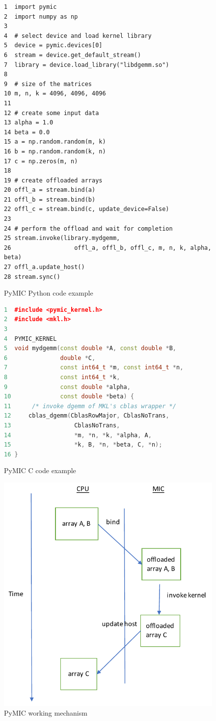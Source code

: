 \begin{figure}
    \centering
    \begin{lstlisting}
1  import pymic
2  import numpy as np
3
4  # select device and load kernel library
5  device = pymic.devices[0]
6  stream = device.get_default_stream()
7  library = device.load_library("libdgemm.so")
8
9  # size of the matrices
10 m, n, k = 4096, 4096, 4096
11
12 # create some input data
13 alpha = 1.0
14 beta = 0.0
15 a = np.random.random(m, k) 
16 b = np.random.random(k, n) 
17 c = np.zeros(m, n)
18
19 # create offloaded arrays
20 offl_a = stream.bind(a)
21 offl_b = stream.bind(b)
22 offl_c = stream.bind(c, update_device=False)
23
24 # perform the offload and wait for completion
25 stream.invoke(library.mydgemm,
26                  offl_a, offl_b, offl_c, m, n, k, alpha, beta)
27 offl_a.update_host()
28 stream.sync()
\end{lstlisting}
    \caption{PyMIC Python code example}  
    \label{fig : Pymic dgemm }
\end{figure}

\begin{figure}
    \centering
    \begin{lstlisting}[language=C++]
1  #include <pymic_kernel.h>
2  #include <mkl.h>
3
4  PYMIC_KERNEL
5  void mydgemm(const double *A, const double *B,
6               double *C,
7               const int64_t *m, const int64_t *n,
8               const int64_t *k,
9               const double *alpha,
10              const double *beta) {
11      /* invoke dgemm of MKL's cblas wrapper */
12     cblas_dgemm(CblasRowMajor, CblasNoTrans,
13                  CblasNoTrans,
14                  *m, *n, *k, *alpha, A,
15                  *k, B, *n, *beta, C, *n);
16 }
\end{lstlisting}
    \caption{PyMIC C code example}
    \label{fig : C dgemm}

\end{figure}

\begin{figure}[h]
\centering
\includegraphics[scale=0.5]{img/working-mechanism.pdf}
\caption{PyMIC working mechanism}
\label{fig:working mechanism}
\end{figure}